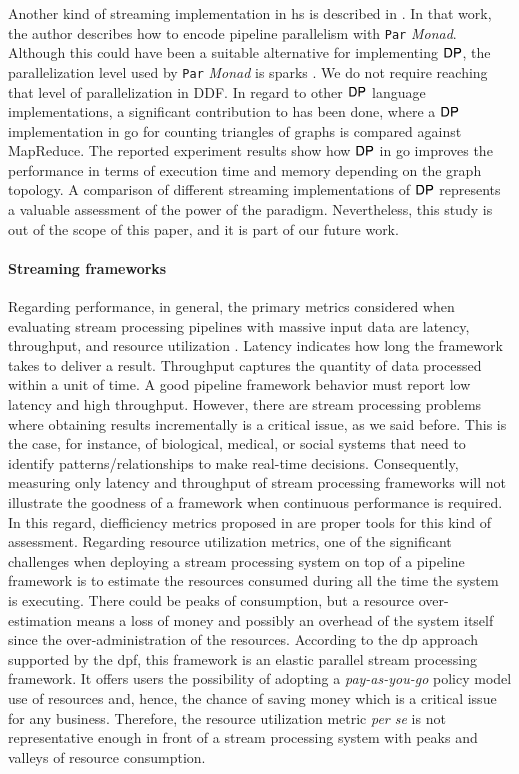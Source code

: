 \fi
Another kind of streaming implementation in \acrshort{hs} is described in \cite{parallelbook}. In that work, the author describes how to encode pipeline parallelism with \texttt{Par} \textit{Monad}. 
Although this could have been a suitable alternative for implementing $\mathsf{DP}$, the parallelization level used by \texttt{Par} \textit{Monad} is sparks \cite{sparks}. We do not require reaching that level of parallelization in DDF. In regard to other $\mathsf{DP}$ language implementations, a significant contribution to \cite{dpp_triangles} has been done, where a $\mathsf{DP}$ implementation in \acrfull{go} for counting triangles of graphs is compared against MapReduce. The reported experiment results show how $\mathsf{DP}$ in \acrshort{go} improves the performance in terms of execution time and memory depending on the graph topology. A comparison of different streaming implementations of $\mathsf{DP}$ represents a valuable assessment of the power of the paradigm. Nevertheless, this study is out of the scope of this paper, and it is part of our future work.   

\paragraph{Streaming frameworks} 
Regarding performance, in general, the primary metrics considered when evaluating stream processing pipelines with massive input data are latency, throughput, and resource utilization \cite{van2020evaluation}. Latency indicates how long the framework takes to deliver a result. Throughput captures the quantity of data processed within a unit of time. A good pipeline framework behavior must report low latency and high throughput. However, there are stream processing problems where obtaining results incrementally is a critical issue, as we said before. This is the case, for instance, of biological, medical, or social systems that need to identify patterns/relationships to make real-time decisions.
Consequently, measuring only latency and throughput of stream processing frameworks will not illustrate the goodness of a framework when continuous performance is required. In this regard, diefficiency metrics proposed in \cite{diefpaper} are proper tools for this kind of assessment. Regarding resource utilization metrics, one of the significant challenges when deploying a  stream processing system on top of a pipeline framework is to estimate the resources consumed during all the time the system is executing. There could be peaks of consumption, but a resource over-estimation means a loss of money and possibly an overhead of the system itself since the over-administration of the resources.   According to the \acrshort{dp} approach supported by the \acrshort{dpf}, this framework is an elastic parallel stream processing framework. It offers users the possibility of adopting a \textit{pay-as-you-go} policy model \cite{payg} use of resources and, hence,  the chance of saving money which is a critical issue for any business. Therefore, the resource utilization metric \textit{per se} is not representative enough in front of a stream processing system with peaks and valleys of resource consumption.

